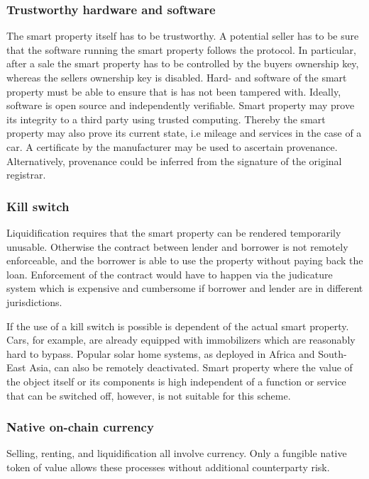 
\subsubsection{Trustworthy hardware and software}

The smart property itself has to be trustworthy. A potential seller has to be sure that the software running the smart property follows the protocol. In particular, after a sale the smart property has to be controlled by the buyers ownership key, whereas the sellers ownership key is disabled. Hard- and software of the smart property must be able to ensure that is has not been tampered with. Ideally, software is open source and independently verifiable. Smart property may prove its integrity to a third party using trusted computing. Thereby the smart property may also prove its current state, i.e mileage and services in the case of a car. A certificate by the manufacturer may be used to ascertain provenance. Alternatively, provenance could be inferred from the signature of the original registrar.

\subsubsection{Kill switch}

Liquidification requires that the smart property can be rendered temporarily unusable. Otherwise the contract between lender and borrower is not remotely enforceable, and the borrower is able to use the property without paying back the loan. Enforcement of the contract would have to happen via the judicature system which is expensive and cumbersome if borrower and lender are in different jurisdictions. 

If the use of a kill switch is possible is dependent of the actual smart property. Cars, for example, are already equipped with immobilizers which are reasonably hard to bypass. Popular solar home systems, as deployed in Africa and South-East Asia, can also be remotely deactivated. Smart property where the value of the object itself or its components is high independent of a function or service that can be switched off, however, is not suitable for this scheme. 

\subsubsection{Native on-chain currency}
Selling, renting, and liquidification all involve currency. Only a fungible native token of value allows these processes without additional counterparty risk. 

